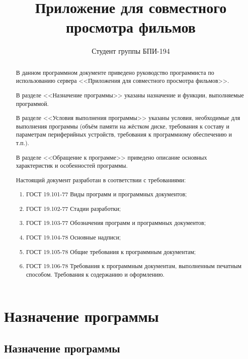 \documentclass{../includes/TechDoc}
\title{Приложение для совместного просмотра фильмов}
\author{Студент группы БПИ-194}{В. А. Анненков}
\begin{document}
    \maketitle

    \begin{abstract}
        В данном программном документе приведено руководство программиста по использованию сервера <<Приложения для совместного просмотра фильмов>>.

        В разделе <<Назначение программы>> указаны назначение и функции, выполняемые программой.

        В разделе <<Условия выполнения программы>> указаны условия, необходимые для выполнения программы (объём памяти на жёстком диске, требования к составу и параметрам периферийных устройств, требования к программному обеспечению и т.п.).

        В разделе <<Обращение к программе>> приведено описание основных характеристик и особенностей программы.

        Настоящий документ разработан в соответствии с требованиями:
        \begin{enumerate}
            \item ГОСТ 19.101-77 Виды программ и программных документов;
            \item ГОСТ 19.102-77 Стадии разработки;
            \item ГОСТ 19.103-77 Обозначения программ и программных документов;
            \item ГОСТ 19.104-78 Основные надписи;
            \item ГОСТ 19.105-78 Общие требования к программным документам;
            \item ГОСТ 19.106-78 Требования к программным документам, выполненным печатным способом.
            Требования к содержанию и оформлению.
        \end{enumerate}
    \end{abstract}

    \newpage

    \tableofcontents

    \section{Назначение программы}

    \subsection{Назначение программы}
\end{document}
